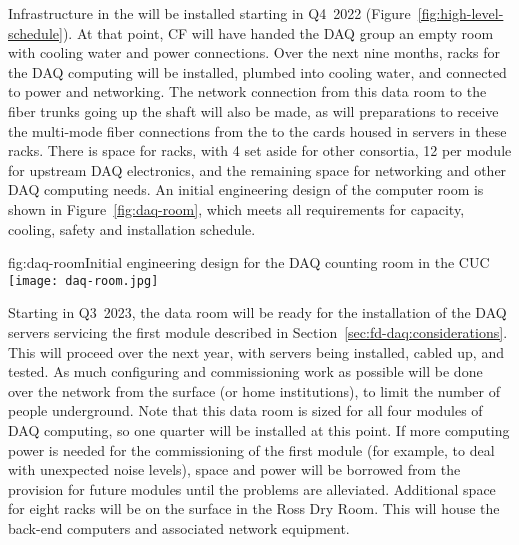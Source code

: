 

Infrastructure in the  will be installed starting in Q4~2022
(Figure~\ref{fig:high-level-schedule}).  At that point, CF will have
handed the DAQ group an empty room with cooling water and power
connections.  Over the next nine months, racks for the DAQ computing
will be installed, plumbed into cooling water, and connected to power
and networking.  The network connection from this data room to the fiber
trunks going up the shaft will also be made, as will preparations to
receive the multi-mode fiber connections from the  to the
 cards housed in servers in these racks. There is space
for \cucracks racks, with 4 set aside for other consortia, 12 per
module for upstream DAQ electronics, and the remaining space for
networking and other DAQ computing needs. An initial engineering design of the computer room is shown in Figure~\ref{fig:daq-room}, which meets all requirements for capacity, cooling, safety and installation schedule.

\begin{dunefigure}{fig:daq-room}{Initial engineering design for the DAQ counting room in the CUC}
  \texttt{[image: daq-room.jpg]}
\end{dunefigure}

Starting in Q3~2023, the data room will be ready for the installation of
the DAQ servers servicing the first module described in
Section~\ref{sec:fd-daq:considerations}.  This will proceed over the
next year, with servers being installed, cabled up, and tested.
As much configuring and commissioning work as possible will be done over
the network from the surface (or home institutions), to limit the number
of people underground.  Note that this data room is sized for all four
modules of DAQ computing, so one quarter will be installed at this
point.  If more computing power is needed for the commissioning of the
first module (for example, to deal with unexpected noise levels), space
and power will be borrowed from the provision for future modules until the problems are
alleviated. 
Additional space for eight racks will be on the surface in the Ross Dry
Room. This will house the back-end computers and associated network equipment.

